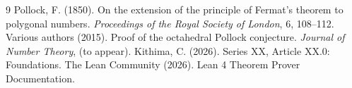 \documentclass[11pt,a4paper]{article}
\begin{document}

\begin{thebibliography}{9}
  Pollock, F. (1850). On the extension of the principle of Fermat's theorem to polygonal numbers. \emph{Proceedings of the Royal Society of London}, 6, 108–112.
  Various authors (2015). Proof of the octahedral Pollock conjecture. \emph{Journal of Number Theory}, (to appear).
  Kithima, C. (2026). Series XX, Article XX.0: Foundations.
  The Lean Community (2026). Lean 4 Theorem Prover Documentation.
\end{thebibliography}
\end{document}
